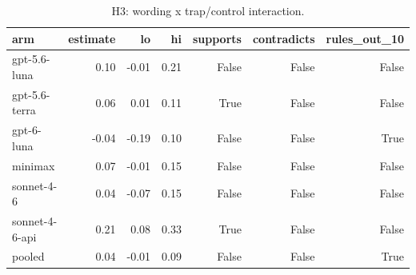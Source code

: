\begin{table}[t]
\centering
\small
\caption{H3: wording x trap/control interaction.}
\label{tab:crt-b-h3x}
\begin{tabular}{lrrrrrr}
\toprule
arm & estimate & lo & hi & supports & contradicts & rules\_out\_10 \\
\midrule
gpt-5.6-luna & 0.10 & -0.01 & 0.21 & False & False & False \\
gpt-5.6-terra & 0.06 & 0.01 & 0.11 & True & False & False \\
gpt-6-luna & -0.04 & -0.19 & 0.10 & False & False & True \\
minimax & 0.07 & -0.01 & 0.15 & False & False & False \\
sonnet-4-6 & 0.04 & -0.07 & 0.15 & False & False & False \\
sonnet-4-6-api & 0.21 & 0.08 & 0.33 & True & False & False \\
pooled & 0.04 & -0.01 & 0.09 & False & False & True \\
\bottomrule
\end{tabular}
\end{table}
